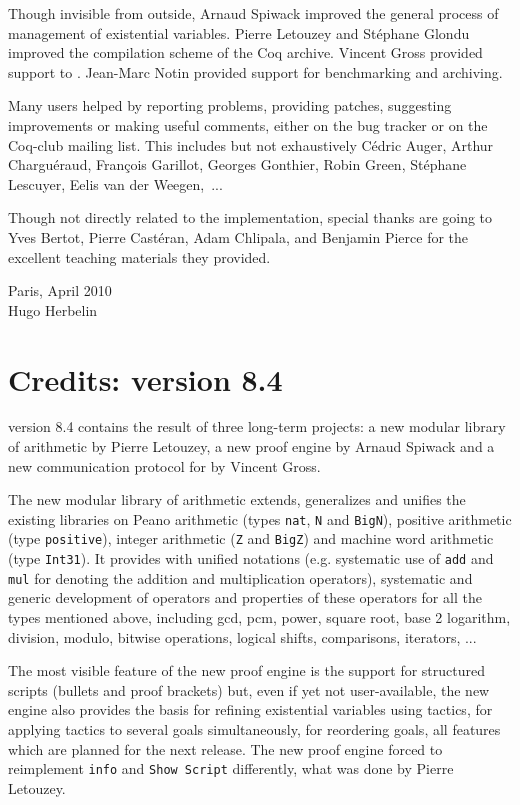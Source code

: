 Though invisible from outside, Arnaud Spiwack improved the general
process of management of existential variables. Pierre Letouzey and
Stéphane Glondu improved the compilation scheme of the Coq archive.
Vincent Gross provided support to {\CoqIDE}. Jean-Marc Notin provided
support for benchmarking and archiving.

Many users helped by reporting problems, providing patches, suggesting
improvements or making useful comments, either on the bug tracker or
on the Coq-club mailing list. This includes but not exhaustively
Cédric Auger, Arthur Charguéraud, François Garillot, Georges Gonthier,
Robin Green, Stéphane Lescuyer, Eelis van der Weegen,~...

Though not directly related to the implementation, special thanks are
going to Yves Bertot, Pierre Castéran, Adam Chlipala, and Benjamin
Pierce for the excellent teaching materials they provided.

\begin{flushright}
Paris, April 2010\\
Hugo Herbelin\\
\end{flushright}

\section*{Credits: version 8.4}

{\Coq} version 8.4 contains the result of three long-term projects: a
new modular library of arithmetic by Pierre Letouzey, a new proof
engine by Arnaud Spiwack and a new communication protocol for {\CoqIDE}
by Vincent Gross.

The new modular library of arithmetic extends, generalizes and
unifies the existing libraries on Peano arithmetic (types {\tt nat},
{\tt N} and {\tt BigN}), positive arithmetic (type {\tt positive}),
integer arithmetic ({\tt Z} and {\tt BigZ}) and machine word
arithmetic (type {\tt Int31}). It provides with unified notations
(e.g. systematic use of {\tt add} and {\tt mul} for denoting the
addition and multiplication operators), systematic and generic
development of operators and properties of these operators for all the
types mentioned above, including gcd, pcm, power, square root, base 2
logarithm, division, modulo, bitwise operations, logical shifts,
comparisons, iterators, ...

The most visible feature of the new proof engine is the support for
structured scripts (bullets and proof brackets) but, even if yet not
user-available, the new engine also provides the basis for refining
existential variables using tactics, for applying tactics to several
goals simultaneously, for reordering goals, all features which are
planned for the next release. The new proof engine forced to
reimplement {\tt info} and {\tt Show Script} differently, what was
done by Pierre Letouzey.

